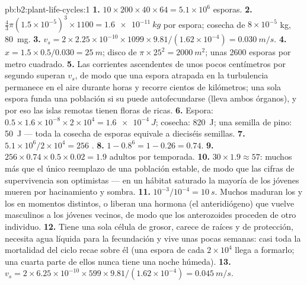 \begin{solution}{pb:b2:plant-life-cycles:1}
\textbf{1.} $10\times 200\times 40\times 64 = 5.1\times 10^{6}$
esporas.
\textbf{2.} $\tfrac43\pi(1.5\times 10^{-5})^3\times 1100 =
\qty{1.6e-11}{kg}$ por espora; cosecha de $8\times 10^{-5}$ kg, \qty{80}{mg}.
\textbf{3.} $v_s = 2\times 2.25\times 10^{-10}\times 1099\times
9.81/(1.62\times 10^{-4}) = \qty{0.030}{m/s}$.
\textbf{4.} $x = 1.5\times 0.5/0.030 = \qty{25}{m}$; disco de
$\pi\times 25^2 = \qty{2000}{m^2}$; unas \num{2600} esporas por metro
cuadrado.
\textbf{5.} Las corrientes ascendentes de unos pocos centímetros por
segundo superan $v_s$, de modo que una espora atrapada en la turbulencia
permanece en el aire durante horas y recorre cientos de kilómetros; una
sola espora funda una población si su  puede autofecundarse (lleva
ambos órganos), y por eso las islas remotas tienen floras de 
ricas.
\textbf{6.} Espora: $0.5\times 1.6\times 10^{-8}\times 2\times 10^{4} =
\qty{1.6e-4}{J}$; cosecha: \qty{820}{J}; una semilla de pino: \qty{50}{J}
--- toda la cosecha de esporas equivale a dieciséis semillas.
\textbf{7.} $5.1\times 10^{6}/2\times 10^{4} = 256$ .
\textbf{8.} $1 - 0.8^{6} = 1 - 0.26 = 0.74$.
\textbf{9.} $256\times 0.74\times 0.5\times 0.02 = 1.9$  adultos
por temporada.
\textbf{10.} $30\times 1.9 \approx 57$: muchos más que el único reemplazo
de una población estable, de modo que las cifras de supervivencia son
optimistas --- en un hábitat saturado la mayoría de los 
jóvenes mueren por hacinamiento y sombra.
\textbf{11.} $10^{-3}/10^{-4} = \qty{10}{s}$. Muchos  maduran los
 y los  en momentos distintos, o liberan una hormona
(el anteridiógeno) que vuelve masculinos a los  jóvenes vecinos,
de modo que los anterozoides proceden de otro individuo.
\textbf{12.} Tiene una sola célula de grosor, carece de raíces y de
protección, necesita agua líquida para la fecundación y vive unas pocas
semanas: casi toda la mortalidad del ciclo recae sobre él (una espora de
cada $2\times 10^{4}$ llega a formarlo; una cuarta parte de ellos nunca
tiene una noche húmeda).
\textbf{13.} $v_s = 2\times 6.25\times 10^{-10}\times 599\times
9.81/(1.62\times 10^{-4}) = \qty{0.045}{m/s}$.

\end{solution}

